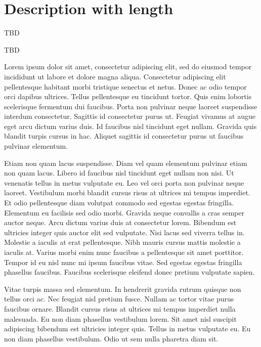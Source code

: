 \section{Description with length}
\begin{info} [Information]
	\begin{description} [leftmargin=!,labelwidth=\widthof{\bfseries xxxxxxxxxxxxxxxxxx}] 
		
		\item[Item 1  ] TBD 
		\item[Item 2  ] TBD
	\end{description}
\end{info}


Lorem ipsum dolor sit amet, consectetur adipiscing elit, sed do eiusmod tempor incididunt ut labore et dolore magna aliqua. Consectetur adipiscing elit pellentesque habitant morbi tristique senectus et netus. Donec ac odio tempor orci dapibus ultrices. Tellus pellentesque eu tincidunt tortor. Quis enim lobortis scelerisque fermentum dui faucibus. Porta non pulvinar neque laoreet suspendisse interdum consectetur. Sagittis id consectetur purus ut. Feugiat vivamus at augue eget arcu dictum varius duis. Id faucibus nisl tincidunt eget nullam. Gravida quis blandit turpis cursus in hac. Aliquet sagittis id consectetur purus ut faucibus pulvinar elementum.

Etiam non quam lacus suspendisse. Diam vel quam elementum pulvinar etiam non quam lacus. Libero id faucibus nisl tincidunt eget nullam non nisi. Ut venenatis tellus in metus vulputate eu. Leo vel orci porta non pulvinar neque laoreet. Vestibulum morbi blandit cursus risus at ultrices mi tempus imperdiet. Et odio pellentesque diam volutpat commodo sed egestas egestas fringilla. Elementum eu facilisis sed odio morbi. Gravida neque convallis a cras semper auctor neque. Arcu dictum varius duis at consectetur lorem. Bibendum est ultricies integer quis auctor elit sed vulputate. Nisi lacus sed viverra tellus in. Molestie a iaculis at erat pellentesque. Nibh mauris cursus mattis molestie a iaculis at. Varius morbi enim nunc faucibus a pellentesque sit amet porttitor. Tempor id eu nisl nunc mi ipsum faucibus vitae. Sed egestas egestas fringilla phasellus faucibus. Faucibus scelerisque eleifend donec pretium vulputate sapien.

Vitae turpis massa sed elementum. In hendrerit gravida rutrum quisque non tellus orci ac. Nec feugiat nisl pretium fusce. Nullam ac tortor vitae purus faucibus ornare. Blandit cursus risus at ultrices mi tempus imperdiet nulla malesuada. Eu non diam phasellus vestibulum lorem. Sit amet nisl suscipit adipiscing bibendum est ultricies integer quis. Tellus in metus vulputate eu. Eu non diam phasellus vestibulum. Odio ut sem nulla pharetra diam sit.

